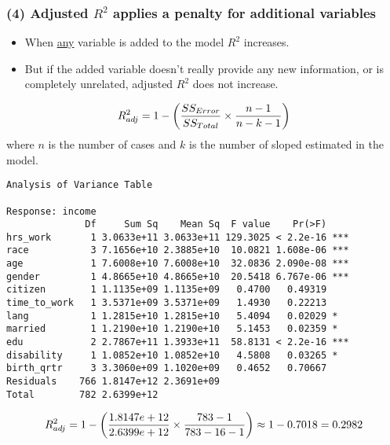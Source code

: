 \documentclass[slidestop,compress,mathserif,12pt,t,professionalfonts,xcolor=table]{beamer}
\begin{document}

\begin{frame}
\frametitle{(4) Adjusted $R^2$ applies a penalty for additional variables}

\begin{itemize}

\item When \underline{any} variable is added to the model $R^2$ increases.

\pause

\item But if the added variable doesn't really provide any new information, or is completely unrelated, adjusted $R^2$ does not increase.

\end{itemize}

\pause

{\[ R^2_{adj} = 1 - \left(  \frac{ SS_{Error} }{ SS_{Total} } \times \frac{n - 1}{n - k - 1}  \right) \]
where $n$ is the number of cases and $k$ is the number of sloped estimated in the model.
}

\end{frame}


\begin{frame}[fragile]

{\tiny
\begin{Verbatim}[frame=single, formatcom=\color{gray}]
Analysis of Variance Table

Response: income
              Df     Sum Sq    Mean Sq  F value    Pr(>F)    
hrs_work       1 3.0633e+11 3.0633e+11 129.3025 < 2.2e-16 ***
race           3 7.1656e+10 2.3885e+10  10.0821 1.608e-06 ***
age            1 7.6008e+10 7.6008e+10  32.0836 2.090e-08 ***
gender         1 4.8665e+10 4.8665e+10  20.5418 6.767e-06 ***
citizen        1 1.1135e+09 1.1135e+09   0.4700   0.49319    
time_to_work   1 3.5371e+09 3.5371e+09   1.4930   0.22213    
lang           1 1.2815e+10 1.2815e+10   5.4094   0.02029 *  
married        1 1.2190e+10 1.2190e+10   5.1453   0.02359 *  
edu            2 2.7867e+11 1.3933e+11  58.8131 < 2.2e-16 ***
disability     1 1.0852e+10 1.0852e+10   4.5808   0.03265 *  
birth_qrtr     3 3.3060e+09 1.1020e+09   0.4652   0.70667    
Residuals    766 1.8147e+12 2.3691e+09          
Total        782 2.6399e+12             
\end{Verbatim}
}

\[ R^2_{adj} = 1 - \left(  \frac{1.8147e+12}{ 2.6399e+12 } \times \frac{783 - 1}{783 - 16 - 1}  \right) \approx 1 - 0.7018 = 0.2982 \]

\end{frame}
\end{document}

